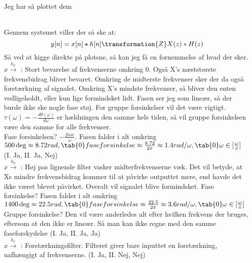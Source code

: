 \begin{Opgaver}
\begin{kapitel}
\begin{Opgave}
            Jeg har så plottet dem\\\\
            \vspace{100pt}
            
            Gennem systemet viller der så ske at: 
            \[y[n] = x[n] \star h[n] \transformation{Z} X(z)*H(z)\]
            Så ved at kigge direkte på plotsne, så kan jeg få en fornemmelse af hvad der sker. \\
            
            $x \overset{h_a}{\rightarrow}$ : Stort bevarelse af frekvenserne omkring 0. Også X's næststørste frekvensbidrag bliver bevaret.
            Omkring de midterste frekvenser sker der da også forstærkning af signalet. Omkring X's mindste frekvenser, så bliver den enten vedligeholdt, eller kun lige formindsket lidt. 
            Fasen ser jeg som lineær, så der burde ikke ske nogle fase støj. 
            For gruppe forsinkelser vil det være vigtigt. $\tau(\omega) = - \frac{d\theta(\omega)}{d\omega}$ er hældningen den samme hele tiden, så vil gruppe forsinkelsen være den samme for alle frekvenser.\\
            Fase forsinkelsen? $- \frac{fase}{\omega}$. Fasen falder i alt omkring $500\deg \approx 8.72rad, \tab{0} faseforsinkelse \approx \frac{8.72}{2\pi} \approx 1.4rad/\omega, \tab{0} \omega \in [\frac{\omega}{\pi}]$
            (I. Ja, II. Ja, Nej)\\

            $x \overset{h_b}{\rightarrow}$ : Høj pas lignende filter vasker midterfrekvenserne væk. Det vil betyde, at Xs mindre frekvensbidrag kommer til at påvirke outputtet mere, end havde det ikke været blevet påvirket. 
            Overalt vil signalet blive formindsket. 
            Fase forsinkelse? Fasen falder i alt omkring $1400\deg \approx 22.5rad, \tab{0} faseforsinkelse \approx \frac{22.5}{2\pi} \approx 3.6rad/\omega, \tab{0} \omega \in [\frac{\omega}{\pi}]$\\
            Gruppe forsinkelse? Den vil være anderledes alt efter hvilken frekvens der bruges, eftersom at den ikke er lineær. 
            Så man kan ikke regne med den samme faseforskydelse 
            (I. Ja, II. Ja, Ja)\\

            $x \overset{h_c}{\rightarrow}$ : Forstærkningsfilter. Filteret giver bare inputtet en forstærkning, uafhængigt af frekvenserne.
            (I. Ja, II. Nej, Nej)\\


\end{Opgave}
\end{kapitel}
\end{Opgaver}
